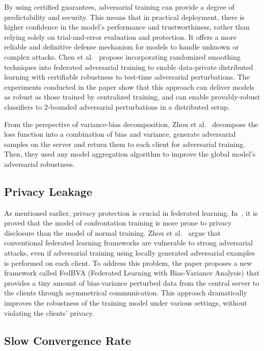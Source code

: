 \documentclass[pdflatex,sn-mathphys-num]{sn-jnl}%
\theoremstyle{thmstyleone}%
\theoremstyle{thmstyletwo}%
\theoremstyle{thmstylethree}%
\begin{document}
By using certified guarantees, adversarial training can
provide a degree of predictability and security. This means
that in practical deployment, there is higher confidence in
the model's performance and trustworthiness, rather than
relying solely on trial-and-error evaluation and protection.
It offers a more reliable and definitive defense mechanism
for models to handle unknown or complex attacks.
Chen et al.~\cite{chen2021certifiably} propose incorporating randomized
smoothing techniques into federated adversarial training
to enable data-private distributed learning with
certifiable robustness to test-time adversarial perturbations.
The experiments conducted in the paper show that this
approach can deliver models as robust as those trained
by centralized training, and can enable provably-robust
classifiers to 2-bounded adversarial perturbations in a
distributed setup.

From the perspective of variance-bias decomposition,
Zhou et al.~\cite{zhou2022adversarial} decompose the loss function into a
combination of bias and variance, generate adversarial
samples on the server and return them to each client for
adversarial training. Then, they used any model
aggregation algorithm to improve the global model's adversarial robustness.

\subsection{Privacy Leakage}
As mentioned earlier, privacy protection is crucial in
federated learning. In~\cite{zhang2022privacy}, it is proved that the model of
confrontation training is more prone to privacy disclosure
than the model of normal training. Zhou et al.~\cite{zhou2020adversarially}
argue that conventional federated learning frameworks are
vulnerable to strong adversarial attacks, even if adversarial
training using locally generated adversarial examples is
performed on each client. To address this problem, the
paper proposes a new framework called FedBVA (Federated
Learning with Bias-Variance Analysis) that provides a tiny
amount of bias-variance perturbed data from the central
server to the clients through asymmetrical communication.
This approach dramatically improves the robustness of the
training model under various settings, without violating
the clients' privacy.

\subsection{Slow Convergence Rate}
\end{document}
